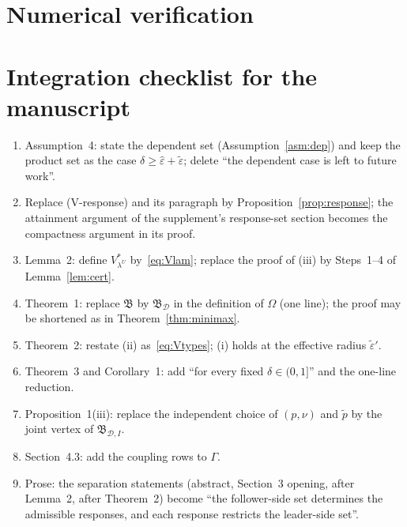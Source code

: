 \documentclass[11pt]{article}
\theoremstyle{definition}
\theoremstyle{remark}
\newcommand{\D}{\mathcal{D}}
\newcommand{\tp}{\tilde{p}}
\newcommand{\heps}{\hat{\varepsilon}}
\newcommand{\teps}{\tilde{\varepsilon}}
\newcommand{\B}{\mathfrak{B}}
\begin{document}
\section{Numerical verification}\label{sec:num}



\section{Integration checklist for the manuscript}

\begin{enumerate}[nosep]
\item Assumption~4: state the dependent set (Assumption~\ref{asm:dep}) and keep the product set as the case $\delta\ge\heps+\teps$; delete ``the dependent case is left to future work''.
\item Replace (V-response) and its paragraph by Proposition~\ref{prop:response}; the attainment argument of the supplement's response-set section becomes the compactness argument in its proof.
\item Lemma~2: define $V^*_{\lambda^U}$ by~\eqref{eq:Vlam}; replace the proof of (iii) by Steps~1--4 of Lemma~\ref{lem:cert}.
\item Theorem~1: replace $\B$ by $\B_\D$ in the definition of $\Omega$ (one line); the proof may be shortened as in Theorem~\ref{thm:minimax}.
\item Theorem~2: restate (ii) as~\eqref{eq:Vtypes}; (i) holds at the effective radius $\teps'$.
\item Theorem~3 and Corollary~1: add ``for every fixed $\delta\in(0,1]$'' and the one-line reduction.
\item Proposition~1(iii): replace the independent choice of $(p,\nu)$ and $\tp$ by the joint vertex of $\B_{\D,I}$.
\item Section~4.3: add the coupling rows to $\Gamma$.
\item Prose: the separation statements (abstract, Section~3 opening, after Lemma~2, after Theorem~2) become ``the follower-side set determines the admissible responses, and each response restricts the leader-side set''.
\end{enumerate}
\end{document}
